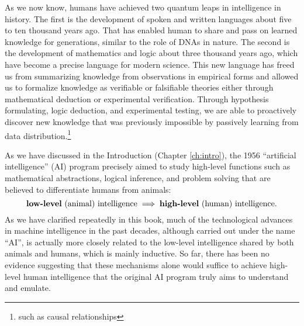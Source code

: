 \documentclass[../../book-main.tex]{subfiles}
\begin{document}
As we now know, humans have achieved two quantum leaps in intelligence in history.
The first is the development of spoken and written languages about five to ten thousand years ago. That has enabled human to share and pass on learned knowledge for generations, similar to the role of DNAs in nature. The second is the development of mathematics and logic about three thousand years ago, which have become a precise language for modern science. This new language has freed us from summarizing knowledge from observations in empirical forms and allowed us to formalize knowledge as verifiable or falsifiable theories either through mathematical deduction or experimental verification. Through hypothesis formulating, logic deduction, and experimental testing, we are able to proactively discover new knowledge that was previously impossible by passively learning from data distribution.\footnote{such as causal relationships}

As we have discussed in the Introduction (Chapter \ref{ch:intro}), the 1956 ``artificial intelligence'' (AI) program precisely aimed to study high-level functions such as mathematical abstractions, logical inference, and problem solving that are believed to differentiate humans from animals: 
\begin{equation}
   \mbox{\textbf{low-level} (animal) intelligence} \; \Longrightarrow \; 
   \mbox{\textbf{high-level} (human) intelligence.}
\end{equation}
As we have clarified repeatedly in this book, much of the technological advances in machine intelligence in the past decades, although carried out under the name ``AI'', is actually more closely related to the low-level intelligence shared by both animals and humans, which is mainly inductive. So far, there has been no evidence suggesting that these mechanisms alone would suffice to achieve high-level human intelligence that the original AI program truly aims to understand and emulate. 
\end{document}
